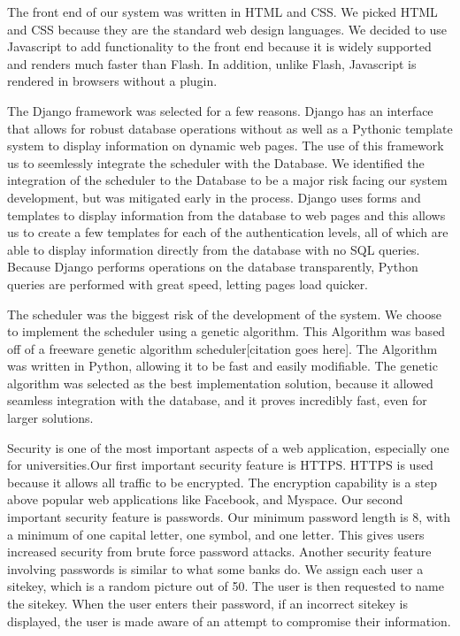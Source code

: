 \documentclass[12pt]{article}
\begin{document}
The front end of our system was written in HTML and CSS. We picked HTML and CSS because they are the standard web design languages. We decided to use Javascript to add functionality to the front end because it is widely supported and renders much faster than Flash. In addition, unlike Flash, Javascript is rendered in browsers without a plugin.

The Django framework was selected for a few reasons. Django has an interface that allows for robust database operations without as well as a Pythonic template system to display information on dynamic web pages. The use of this framework us to seemlessly integrate the scheduler with the Database. We identified the integration of the scheduler to the Database to be a major risk facing our system development, but was mitigated early in the process. Django uses forms and templates to display information from the database to web pages and this allows us to create a few templates for each of the authentication levels, all of which are able to display information directly from the database with no SQL queries. Because Django performs operations on the database transparently, Python queries are performed with great speed, letting pages load quicker. %

The scheduler was the biggest risk of the development of the system. We choose to implement the scheduler using a genetic algorithm. This Algorithm was based off of a freeware genetic algorithm scheduler[citation goes here]. The Algorithm was written in Python, allowing it to be fast and easily modifiable. The genetic algorithm was selected as the best implementation solution, because it allowed seamless integration with the database, and it proves incredibly fast, even for larger solutions.%

Security is one of the most important aspects of a web application, especially one for universities.Our first important security feature is HTTPS. HTTPS is used because it allows all traffic to be encrypted. The encryption capability is a step above popular web applications like Facebook, and Myspace. Our second important security feature is passwords. Our minimum password length is 8, with a minimum of one capital letter, one symbol, and one letter. This gives users increased security from brute force password attacks. Another security feature involving passwords is similar to what some banks do. We assign each user a sitekey, which is a random picture out of 50. The user is then requested to name the sitekey. When the user enters their password, if an incorrect sitekey is displayed, the user is made aware of an attempt to compromise their information. 
\end{document}
